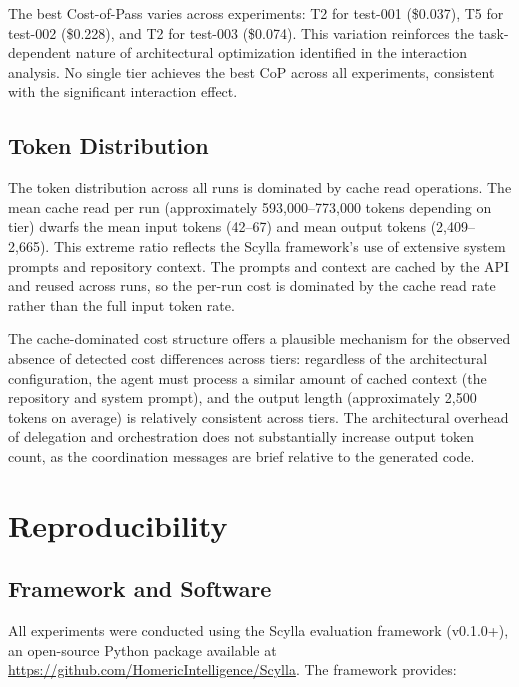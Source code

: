 \documentclass[11pt]{article}
\begin{document}
The best Cost-of-Pass varies across experiments: T2 for test-001 (\$0.037),
T5 for test-002 (\$0.228), and T2 for test-003 (\$0.074). This variation
reinforces the task-dependent nature of architectural optimization identified
in the interaction analysis. No single tier achieves the best CoP across all
experiments, consistent with the significant interaction effect.

\subsection{Token Distribution}

The token distribution across all runs is dominated by cache read operations.
The mean cache read per run (approximately 593,000--773,000 tokens depending
on tier) dwarfs the mean input tokens (42--67) and mean output tokens
(2,409--2,665). This extreme ratio reflects the Scylla framework's use of
extensive system prompts and repository context. The prompts and context are
cached by the API and reused across runs, so the per-run cost is dominated by
the cache read rate rather than the full input token rate.

The cache-dominated cost structure offers a plausible mechanism for the
observed absence of detected cost differences across tiers:
regardless of the architectural configuration, the agent must process a
similar amount of cached context (the repository and system prompt), and the
output length (approximately 2,500 tokens on average) is relatively
consistent across tiers. The architectural overhead of delegation and
orchestration does not substantially increase output token count, as the
coordination messages are brief relative to the generated code.

\section{Reproducibility}
\label{app:reproducibility}

\subsection{Framework and Software}

All experiments were conducted using the Scylla evaluation framework
(v0.1.0+), an open-source Python package available at
\url{https://github.com/HomericIntelligence/Scylla}. The framework
provides:
\end{document}
